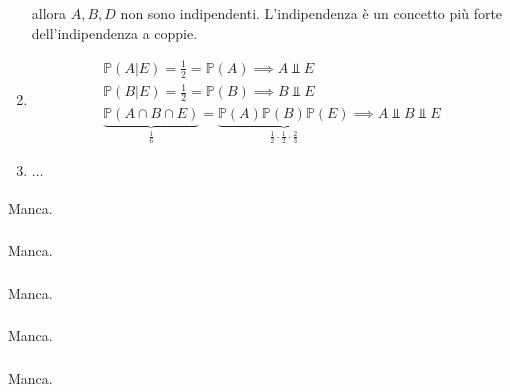\begin{enumerate}
allora $A,B,D$ non sono indipendenti. L'indipendenza è un concetto più forte dell'indipendenza a coppie.
\item \begin{gather*}
\mathbb{P}( A|E) =\frac{1}{2} =\mathbb{P}( A) \implies A\Bot E\\
\mathbb{P}( B|E) =\frac{1}{2} =\mathbb{P}( B) \implies B\Bot E\\
\underbrace{\mathbb{P}( A\cap B\cap E)}_{\frac{1}{6}} =\underbrace{\mathbb{P}( A)\mathbb{P}( B)\mathbb{P}( E)}_{\frac{1}{2} \cdotp \frac{1}{2} \cdotp \frac{2}{3}} \implies A\Bot B\Bot E
\end{gather*}
\item $\dotsc $
\end{enumerate}
\subsubsection{}

Manca.
\subsubsection{}

Manca.
\subsubsection{}

Manca.
\subsubsection{}

Manca.
\subsubsection{}

Manca.
\subsubsection{}

